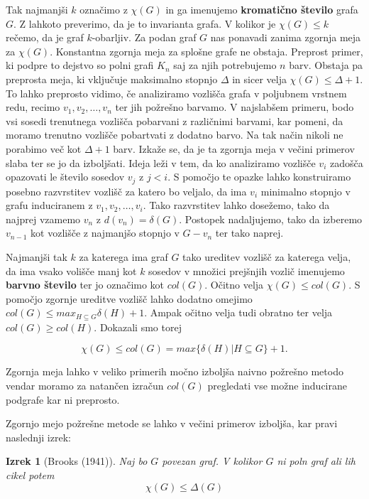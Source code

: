 \documentclass[12pt,a4paper,twoside]{article}
\theoremstyle{definition} %
\theoremstyle{plain} %
\newtheorem{izrek}[definicija]{Izrek}
\numberwithin{equation}{section}  %
\begin{document}
Tak najmanjši $k$ označimo z $\chi(G)$ in ga imenujemo \textbf{kromatično število} grafa $G$. Z lahkoto preverimo, da je to invarianta grafa. V kolikor je $ \chi(G) \le k$ rečemo, da je graf $k$-obarljiv. Za podan graf $G$ nas ponavadi zanima zgornja meja za  $\chi(G)$. Konstantna zgornja meja za splošne grafe ne obstaja. Preprost primer, ki podpre to dejstvo so polni grafi $K_n$ saj za njih potrebujemo $n$ barv. Obstaja pa preprosta meja, ki vključuje maksimalno stopnjo $\Delta$ in sicer velja  $\chi(G) \le \Delta + 1$. To lahko preprosto vidimo, če analiziramo vozlišča grafa v poljubnem vrstnem redu, recimo $v_1, v_2, \dots, v_n$ ter jih požrešno barvamo. V najslabšem primeru, bodo vsi sosedi trenutnega vozlišča pobarvani z različnimi barvami, kar pomeni, da moramo trenutno vozlišče pobartvati z dodatno barvo. Na tak način nikoli ne porabimo več kot $\Delta + 1$ barv. Izkaže se, da je ta zgornja meja v večini primerov slaba ter se jo da izboljšati. Ideja leži v tem, da ko analiziramo vozlišče $v_i$ zadošča opazovati le število sosedov $v_j$ z $j < i$. S pomočjo te opazke lahko konstruiramo posebno razvrstitev vozlišč za katero bo veljalo, da ima $v_i$ minimalno stopnjo v grafu induciranem z $v_1, v_2, \ldots, v_i$. Tako razvrstitev lahko dosežemo, tako da najprej vzamemo $v_n$ z $d(v_n) = \delta(G)$. Postopek nadaljujemo, tako da izberemo $v_{n-1}$ kot vozlišče z najmanjšo stopnjo v $G - v_n$ ter tako naprej.

Najmanjši tak $k$ za katerega ima graf $G$ tako ureditev vozlišč za katerega velja, da ima vsako volišče manj kot $k$ sosedov v množici prejšnjih vozlič  imenujemo \textbf{barvno število} ter jo označimo kot $col(G)$. Očitno velja $\chi(G) \le col(G)$. S pomočjo zgornje ureditve vozlišč lahko dodatno omejimo $col(G) \le  max_{H \subseteq G} \delta(H) + 1$. Ampak očitno velja tudi obratno ter velja $col(G) \ge col(H)$. Dokazali smo torej 

$$ \chi(G) \le col(G) = max\{\delta(H) | H \subseteq G\} + 1.$$

Zgornja meja lahko v veliko primerih močno izboljša naivno požrešno metodo vendar moramo za natančen izračun $col(G)$ pregledati vse možne inducirane podgrafe kar ni preprosto.

Zgornjo mejo požrešne metode se lahko v večini primerov izboljša, kar pravi naslednji izrek:
\begin{izrek}[Brooks (1941)]
Naj bo $G$ povezan graf. V kolikor $G$ ni poln graf ali lih cikel potem
$$\chi(G) \le \Delta(G) $$

\end{izrek}
\end{document}
